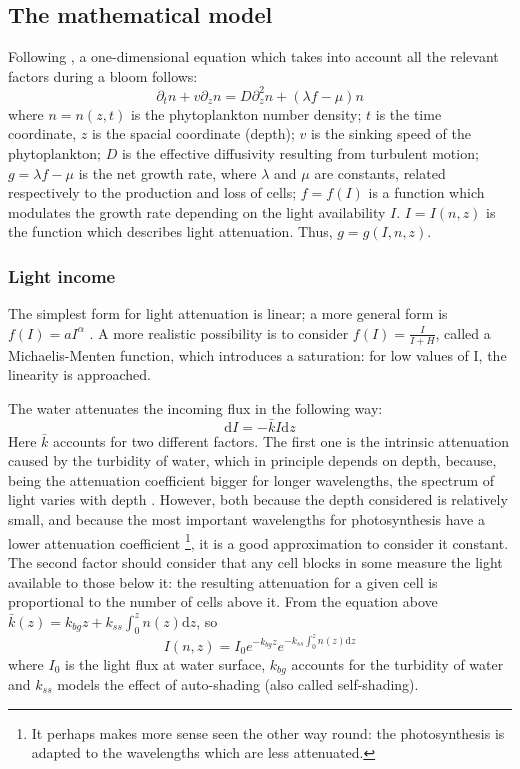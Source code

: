 \subsection{The mathematical model} \label{sec:math-model}
Following \autocite{Shigesada1981AnalysisWaters}, a one-dimensional equation which takes into account all the relevant factors during a bloom follows:
\begin{equation} \label{eq:generic}
    \partial_t n + v \partial_z n = D \partial_z^2 n + (\lambda f - \mu) n
\end{equation}
where \( n = n(z,t) \) is the phytoplankton number density; $t$ is the time coordinate, $z$ is the spacial coordinate (depth); $v$ is the sinking speed of the phytoplankton; $D$ is the effective diffusivity resulting from turbulent motion; \( g = \lambda f - \mu\) is the net growth rate, where $\lambda$ and $\mu$ are constants, related respectively to the production and loss of cells; $f = f(I)$ is a function which modulates the growth rate depending on the light availability $I$. $I = I(n,z)$ is the function which describes light attenuation. Thus, $g = g(I,n,z)$.
\subsubsection{Light income}
The simplest form for light attenuation is linear; a more general form is \(f(I) = a I^\alpha\) \autocite{Ebert2001CriticalBlooms}. A more realistic possibility is to consider \( f(I) = \frac{I}{I+H} \), called a Michaelis-Menten function, which introduces a saturation: for low values of I, the linearity is approached.

The water attenuates the incoming flux in the following way:
\[ \mathrm{d}I = -\bar{k} I \mathrm{d}z \]
Here $\bar{k}$ accounts for two different factors. The first one is the intrinsic attenuation caused by the turbidity of water, which in principle depends on depth, because, being the attenuation coefficient bigger for longer wavelengths, the spectrum of light varies with depth \autocite{Pegau1997AbsorptionSalinity}. However, both because the depth considered is relatively small, and because the most important wavelengths for photosynthesis have a lower attenuation coefficient \footnote{It perhaps makes more sense seen the other way round: the photosynthesis is adapted to the wavelengths which are less attenuated.}, it is a good approximation to consider it constant. The second factor should consider that any cell blocks in some measure the light available to those below it: the resulting attenuation for a given cell is proportional to the number of cells above it. From the equation above \(\bar{k}(z) = k_{bg}z +k_{ss}\int_0^z n(z) \mathrm{d}z\), so
\begin{equation} \label{eq:generic_light}
    I(n,z) = I_0 e^{-k_{bg}z} e^{-k_{ss}\int_0^z n(z) \mathrm{d}z}
\end{equation}
where $I_0$ is the light flux at water surface, $k_{bg}$ accounts for the turbidity of water and $k_{ss}$ models the effect of auto-shading (also called self-shading).


